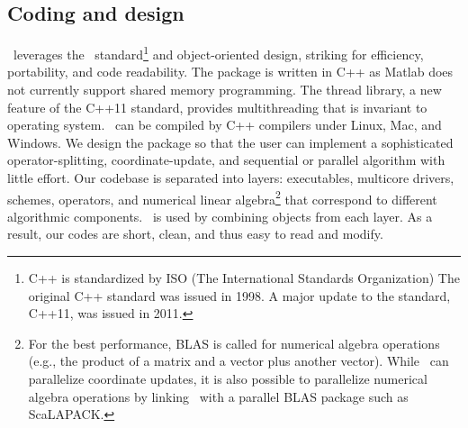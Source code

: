 \subsection{Coding and design}
\pkg~leverages the \cpp~standard\footnote{C++ is standardized by ISO (The International Standards Organization)  The original C++ standard was issued in 1998. A major update to the standard, C++11, was issued in 2011.} and object-oriented design, striking for efficiency, portability, and code readability. The package is written in C++ as Matlab does not currently support shared memory programming. The thread library, a new feature of the C++11 standard, provides multithreading that is invariant to operating system. \pkg~can be compiled by C++ compilers under Linux, Mac, and Windows. We design the package so that the user can implement a sophisticated operator-splitting, coordinate-update, and sequential or parallel algorithm  with little effort. Our codebase is separated into layers: executables, multicore drivers, schemes, operators, and numerical linear algebra\footnote{For the best performance, BLAS is called for numerical algebra operations (e.g., the product of a matrix and a vector plus another vector). While \pkg~can parallelize coordinate updates, it is also possible to parallelize numerical algebra operations by linking \pkg~with a parallel BLAS package such as ScaLAPACK\citep{blackford1997scalapack}.}  that correspond to different algorithmic components. \pkg~is used by combining objects from each layer.
As a result, our codes  are short, clean, and thus easy to read and modify.



